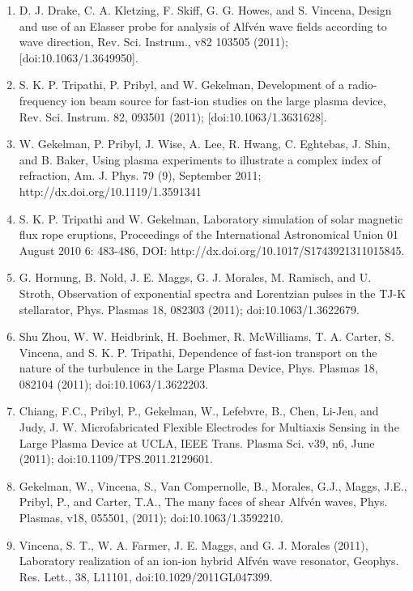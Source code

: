 \documentclass[11pt]{article}
\begin{document}
\begin{enumerate}
\item  D. J. Drake, C. A. Kletzing, F. Skiff, G. G. Howes, and S. Vincena, Design and use of an Elasser probe for analysis of Alfv\'{e}n wave fields according to wave direction, Rev. Sci. Instrum., v82 103505 (2011); [doi:10.1063/1.3649950].

\item   S. K. P. Tripathi, P. Pribyl, and W. Gekelman, Development of a radio-frequency ion beam source for fast-ion studies on the large plasma device, Rev. Sci. Instrum. 82, 093501 (2011); [doi:10.1063/1.3631628].

\item   W. Gekelman, P. Pribyl, J. Wise, A. Lee, R. Hwang, C. Eghtebas, J. Shin, and B. Baker, Using plasma experiments to illustrate a complex index of refraction, Am. J. Phys. 79 (9), September 2011; http://dx.doi.org/10.1119/1.3591341

\item   S. K. P. Tripathi and W. Gekelman, Laboratory simulation of solar magnetic flux rope eruptions, Proceedings of the International Astronomical Union 01 August 2010 6: 483-486, DOI: http://dx.doi.org/10.1017/S1743921311015845.

\item   G. Hornung, B. Nold, J. E. Maggs, G. J. Morales, M. Ramisch, and U. Stroth, Observation of exponential spectra and Lorentzian pulses in the TJ-K stellarator, Phys. Plasmas 18, 082303 (2011); doi:10.1063/1.3622679.

\item  Shu Zhou, W. W. Heidbrink, H. Boehmer, R. McWilliams, T. A. Carter, S. Vincena, and S. K. P. Tripathi, Dependence of fast-ion transport on the nature of the turbulence in the Large Plasma Device, Phys. Plasmas 18, 082104 (2011); doi:10.1063/1.3622203.

\item  Chiang, F.C., Pribyl, P., Gekelman, W., Lefebvre, B., Chen, Li-Jen, and Judy, J. W. Microfabricated Flexible Electrodes for Multiaxis Sensing in the Large Plasma Device at UCLA, IEEE Trans. Plasma Sci. v39, n6, June (2011); doi:10.1109/TPS.2011.2129601.

\item  Gekelman, W., Vincena, S., Van Compernolle, B., Morales, G.J., Maggs, J.E., Pribyl, P., and Carter, T.A., The many faces of shear Alfv\'{e}n waves, Phys. Plasmas, v18, 055501, (2011); doi:10.1063/1.3592210.

\item   Vincena, S. T., W. A. Farmer, J. E. Maggs, and G. J. Morales (2011), Laboratory realization of an ion-ion hybrid Alfv\'{e}n wave resonator, Geophys. Res. Lett., 38, L11101, doi:10.1029/2011GL047399.


\end{enumerate}
\end{document}
